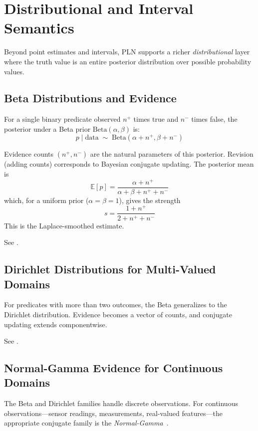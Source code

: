 \documentclass[11pt,openany]{report}
\begin{document}
\chapter{Distributional and Interval Semantics}
\label{ch:distributional}

Beyond point estimates and intervals, PLN supports a richer
\emph{distributional} layer where the truth value is an entire
posterior distribution over possible probability values.

\section{Beta Distributions and Evidence}

For a single binary predicate observed $n^+$ times true and $n^-$ times
false, the posterior under a Beta prior $\text{Beta}(\alpha, \beta)$ is:
\[
  p \mid \text{data} \;\sim\; \text{Beta}(\alpha + n^+, \beta + n^-)
\]

Evidence counts $(n^+, n^-)$ are the natural parameters of this
posterior.  Revision (adding counts) corresponds to Bayesian conjugate
updating.  The posterior mean is
\[
  \mathbb{E}[p] = \frac{\alpha + n^+}{\alpha + \beta + n^+ + n^-}
\]
which, for a uniform prior ($\alpha = \beta = 1$), gives the strength
\[
  s = \frac{1 + n^+}{2 + n^+ + n^-}
\]
This is the Laplace-smoothed estimate.

See .

\section{Dirichlet Distributions for Multi-Valued Domains}

For predicates with more than two outcomes, the Beta generalizes to the
Dirichlet distribution.  Evidence becomes a vector of counts, and
conjugate updating extends componentwise.

See .

\section{Normal-Gamma Evidence for Continuous Domains}
\label{sec:normal-gamma}

The Beta and Dirichlet families handle discrete observations.  For
continuous observations---sensor readings, measurements, real-valued
features---the appropriate conjugate family is the
\emph{Normal-Gamma}~\cite{BernardoSmith2000}.
\end{document}
